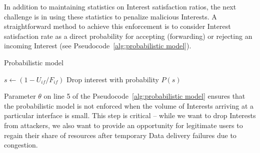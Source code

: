 
In addition to maintaining statistics on Interest satisfaction ratios, the next challenge is in using these statistics to penalize malicious Interests. A straightforward method to achieve this enforcement is to consider Interest satisfaction rate as a direct probability for accepting (forwarding) or rejecting an incoming Interest (see Pseudocode~\ref{alg:probabilistic model}).




\begin{algorithm}[h]
\footnotesize
\caption{\small Probabilistic model}
\label{alg:probabilistic model}
\begin{algorithmic}[1]
\State{} 

\vspace{0.2cm}

    \State{} 
    \State{} 
    
     
        \State $s \leftarrow (1 - U_{if} / F_{if})$
        \State Drop interest with probability $P(s)$
    \EndIf

\EndFunction

\end{algorithmic}
\end{algorithm}

Parameter $\theta$ on line 5 of the Pseudocode~\ref{alg:probabilistic model} ensures that the probabilistic model is not enforced when the volume of Interests arriving at a particular interface is small.
This step is critical -- while we want to drop Interests from attackers, we also want to provide an opportunity for legitimate users to regain their share of resources after temporary Data delivery failures due to  congestion.

